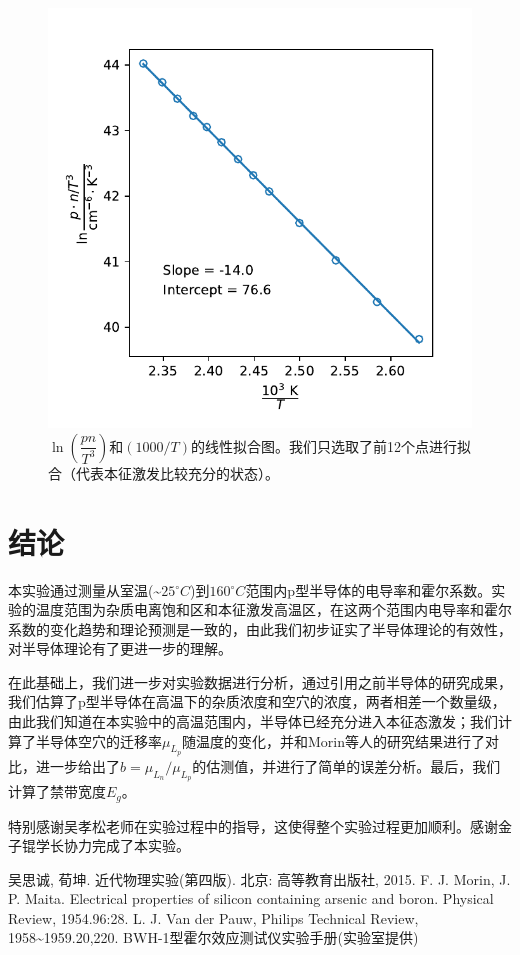 \documentclass[font=default]{mpltx}
\begin{document}
\begin{figure}[h]
  \centering
  \setlength{\abovecaptionskip}{-0.4cm}
  \includegraphics[width=0.5\linewidth]{fig/E_glinfit.pdf}
  \caption{$\ln \left(\dfrac{pn}{T^3}\right)$和$(1000/T)$的线性拟合图。我们只选取了前12个点进行拟合（代表本征激发比较充分的状态）。}
  \label{E_glinfit}
\end{figure}
\section{结论}
本实验通过测量从室温(\textasciitilde$25{^\circ C}$)到$160{^\circ C}$范围内p型半导体的电导率和霍尔系数。实验的温度范围为杂质电离饱和区和本征激发高温区，在这两个范围内电导率和霍尔系数的变化趋势和理论预测是一致的，由此我们初步证实了半导体理论的有效性，对半导体理论有了更进一步的理解。

在此基础上，我们进一步对实验数据进行分析，通过引用之前半导体的研究成果，我们估算了p型半导体在高温下的杂质浓度和空穴的浓度，两者相差一个数量级，由此我们知道在本实验中的高温范围内，半导体已经充分进入本征态激发；我们计算了半导体空穴的迁移率$\mu_{L_p}$随温度的变化，并和Morin等人的研究结果进行了对比，进一步给出了$b=\mu_{L_n}/\mu_{L_p}$的估测值，并进行了简单的误差分析。最后，我们计算了禁带宽度$E_g$。
\begin{acknowledgments}
  特别感谢吴孝松老师在实验过程中的指导，这使得整个实验过程更加顺利。感谢金子锟学长协力完成了本实验。
\end{acknowledgments}

\clearpage
\begin{thebibliography}{}

   吴思诚, 荀坤. 近代物理实验(第四版). 北京: 高等教育出版社, 2015.
   F. J. Morin, J. P. Maita. Electrical properties of silicon containing arsenic and boron. Physical Review, 1954.96:28.
   L. J. Van der Pauw, Philips Technical Review, 1958\textasciitilde1959.20,220.
   BWH-1型霍尔效应测试仪实验手册(实验室提供)
\end{thebibliography}
\end{document}
